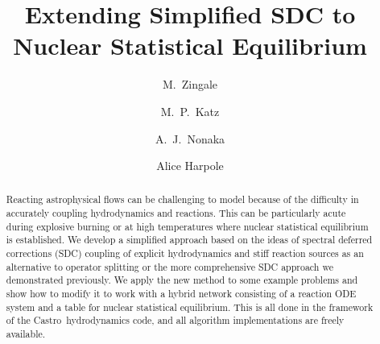 \documentclass[times,modern]{aastex63}
\newcommand{\castro}{{\sf Castro}}
\begin{document}
\title{Extending Simplified SDC to Nuclear Statistical Equilibrium}



\shortauthors{}

\author[0000-0001-8401-030X]{M.~Zingale}

\author[0000-0003-0439-4556]{M.~P.~Katz}

\author[0000-0003-1791-0265]{A.~J.~Nonaka}

\author[0000-0002-1530-781X]{Alice Harpole}



\begin{abstract}
Reacting astrophysical flows can be challenging to model because of
the difficulty in accurately coupling hydrodynamics and reactions.
This can be particularly acute during explosive burning or at high
temperatures where nuclear statistical equilibrium is established.  We
develop a simplified approach based on the ideas of spectral deferred
corrections (SDC) coupling of explicit hydrodynamics and stiff
reaction sources as an alternative to operator splitting or the more
comprehensive SDC approach we demonstrated previously.  We apply the
new method to some example problems and show how to modify it to work
with a hybrid network consisting of a reaction ODE system and a table
for nuclear statistical equilibrium.  This is all done in the
framework of the \castro\ hydrodynamics code, and all algorithm
implementations are freely available.
\end{abstract}

\end{document}
